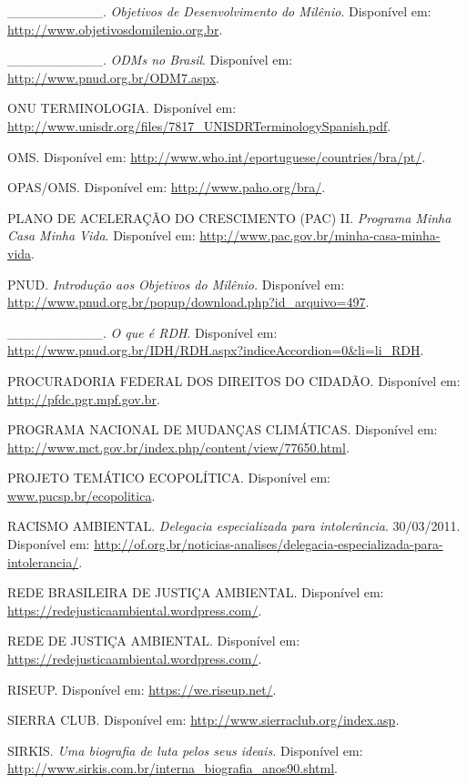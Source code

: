 \_\_\_\_\_\_\_\_\_\_. \emph{Objetivos de Desenvolvimento do Milênio}.
Disponível em:
\href{http://www.objetivosdomilenio.org.br}{{http://www.objetivosdomilenio.org.br}}.

\_\_\_\_\_\_\_\_\_\_. \emph{ODMs no Brasil}. Disponível em:
\url{http://www.pnud.org.br/ODM7.aspx}.

ONU TERMINOLOGIA. Disponível em:
\url{http://www.unisdr.org/files/7817_UNISDRTerminologySpanish.pdf}.

OMS. Disponível em:
\url{http://www.who.int/eportuguese/countries/bra/pt/}.

OPAS/OMS. Disponível em: \url{http://www.paho.org/bra/}.

PLANO DE ACELERAÇÃO DO CRESCIMENTO (PAC) II. \emph{Programa Minha Casa
Minha Vida}. Disponível em:
\href{http://www.pac.gov.br/minha-casa-minha-vida}{{http://www.pac.gov.br/minha-casa-minha-vida}}.

PNUD. \emph{Introdução aos Objetivos do Milênio.} Disponível em:
\url{http://www.pnud.org.br/popup/download.php?id_arquivo=497}.

\_\_\_\_\_\_\_\_\_\_. \emph{O que é RDH}. Disponível em:
\url{http://www.pnud.org.br/IDH/RDH.aspx?indiceAccordion=0\&li=li_RDH}.

PROCURADORIA FEDERAL DOS DIREITOS DO CIDADÃO. Disponível em:
\url{http://pfdc.pgr.mpf.gov.br}.

PROGRAMA NACIONAL DE MUDANÇAS CLIMÁTICAS. Disponível em:
\url{http://www.mct.gov.br/index.php/content/view/77650.html}.

PROJETO TEMÁTICO ECOPOLÍTICA. Disponível em:
\href{http://www.pucsp.br/ecopolitica}{www.pucsp.br/ecopolitica}.

RACISMO AMBIENTAL. \emph{Delegacia especializada para intolerância}.
30/03/2011. Disponível em:
\url{http://of.org.br/noticias-analises/delegacia-especializada-para-intolerancia/}.

REDE BRASILEIRA DE JUSTIÇA AMBIENTAL. Disponível em:
\url{https://redejusticaambiental.wordpress.com/}.

REDE DE JUSTIÇA AMBIENTAL. Disponível em:
\href{file:///C:/Users/Edson/AppData/Local/Temp/(site)\%20https:/redejusticaambiental.wordpress.com/}{https://redejusticaambiental.wordpress.com/}.

RISEUP. Disponível em: \url{https://we.riseup.net/}.

SIERRA CLUB. Disponível em:
\url{http://www.sierraclub.org/index.asp}\emph{.}

SIRKIS. \emph{Uma biografia de luta pelos seus ideais.} Disponível em:
\url{http://www.sirkis.com.br/interna_biografia_anos90.shtml}.

